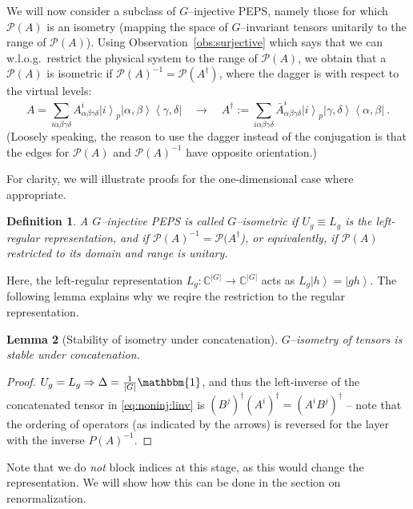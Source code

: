 \documentclass{article}
\newcommand{\openone}{\mathbbm{1}}
\newcommand{\ket}[1]{\left|#1\right\rangle}
\newcommand{\bra}[1]{\left\langle#1\right|}
\newcommand{\mc}[1]{\mathcal{#1}}
\theoremstyle{plain}
\newtheorem{lemma}{Lemma}[section]
\newtheorem{definition}[lemma]{Definition}
\theoremstyle{definition}
\numberwithin{equation}{section}  %
\begin{document}
We will now consider a subclass of $G$--injective PEPS, namely those for
which $\mc P(A)$ is an isometry (mapping the space of $G$--invariant
tensors unitarily to the range of $\mc P(A)$). Using
Observation~\ref{obs:surjective} which says that we can w.l.o.g.\ restrict
the physical system to the range of $\mc P(A)$, we obtain that a
$\mc P(A)$ is isometric if $\mc P(A)^{-1}=\mc P(A^\dagger)$, where the
dagger is with respect to the virtual levels:
\[
    A=\sum_{i\alpha\beta\gamma\delta}A^i_{\alpha\beta\gamma\delta}
    \ket{i}_p\ket{\alpha,\beta}\bra{\gamma,\delta}\quad
    \rightarrow\quad
    A^\dagger:= \sum_{i\alpha\beta\gamma\delta}{\bar{A}}^i_{\alpha\beta\gamma\delta}
    \ket{i}_p\ket{\gamma,\delta}\bra{\alpha,\beta}\ .
\]
(Loosely speaking, the reason to use the dagger instead of the conjugation
is that the edges for $\mc P(A)$ and $\mc P(A)^{-1}$ have opposite
orientation.)

For clarity, we will illustrate proofs for the one-dimensional case where
appropriate.


\begin{definition}
    \label{def:iso:isopeps}
    A $G$--injective PEPS is called $G$--isometric if $U_g\equiv L_g$ is the
    left-regular representation, and if $\mc P(A)^{-1}=\mc P(A^\dagger$), or
    equivalently, if $\mc P(A)$ restricted to its domain and range is unitary.
\end{definition}

Here, the left-regular representation $L_g:\mathbb C^{|G|}\rightarrow \mathbb
    C^{|G|}$ acts as $L_g\ket{h}=\ket{gh}$.
The following lemma explains why we reqire the restriction to the
regular representation.

\begin{lemma}[Stability of isometry under concatenation]
    \label{lemma:iso:iso-stable-under-concat}
    $G$--isometry of tensors is stable under concatenation.
\end{lemma}

\begin{proof}
    $U_g=L_g  \Rightarrow \Delta=\tfrac{1}{|G|}\openone$,
    and thus the left-inverse of the concatenated tensor in
    \eqref{eq:noninj:linv} is $(B^j)^\dagger(A^i)^\dagger=(A^iB^j)^\dagger$ --
    note that the ordering of operators (as indicated by the arrows) is
    reversed for the layer with the inverse $P(A)^{-1}$.
\end{proof}

Note that we do \emph{not} block indices at this stage, as this would
change the representation. We will show how this can be done in
the section on renormalization.
\end{document}
